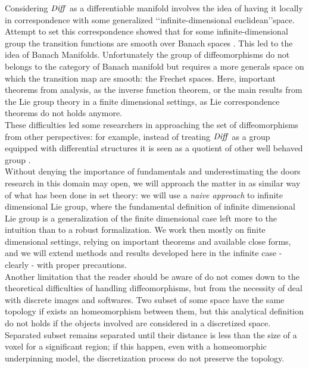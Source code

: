 Considering $\text{\emph{Diff}}$ as a differentiable manifold involves the idea of having it locally in correspondence with some generalized \lq\lq infinite-dimensional euclidean\rq\rq  space. Attempt to set this correspondence showed that for some infinite-dimensional group the transition functions are smooth over Banach spaces \cite{khesin2008geometry}. This led to the idea of Banach Manifolds. Unfortunately the group of diffeomorphisms do not belongs to the category of Banach manifold but requires a more generals space on which the transition map are smooth: the Frechet spaces. Here, important theorems from analysis, as the inverse function theorem, or the main results from the Lie group theory in a finite dimensional settings, as Lie correspondence theorems do not holds anymore.\\
These difficulties led some researchers in approaching the set of diffeomorphisms from other perspectives: 
for example, instead of treating $\text{\emph{Diff}}$ as a group equipped with differential structures it is seen as a quotient of other well behaved group \cite{wojtynski1994one}.\\
Without denying the importance of fundamentals and underestimating the doors research in this domain may open, we will approach the matter in as similar way of what has been done in set theory: we will use a \emph{naive approach} to infinite dimensional Lie group, where the fundamental definition of infinite dimensional Lie group is a generalization of the finite dimensional case left more to the intuition than to a robust formalization. 
We work then mostly on finite dimensional settings, relying on important theorems and available close forms, and we will extend methods and results developed here in the infinite case -clearly - with proper precautions.\\

Another limitation that the reader should be aware of do not comes down to the theoretical difficulties of handling diffeomorphisms, but from the necessity of deal with discrete images and softwares. Two subset of some space have the same topology if exists an homeomorphism between them, but this analytical definition do not holds if the objects involved are considered in a discretized space. Separated subset remains separated until their distance is less than the size of a voxel for a significant region; if this happen, even with a homeomorphic underpinning model, the discretization process do not preserve the topology.\\

